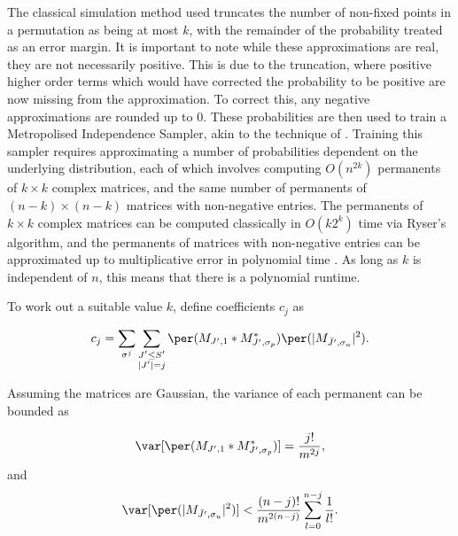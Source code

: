 The classical simulation method used truncates the number of non-fixed points in a permutation as being at most $k$, with the remainder of the probability treated as an error margin. 
It is important to note while these approximations are real, they are not necessarily positive. 
This is due to the truncation, where positive higher order terms which would have corrected the probability to be positive are now missing from the approximation. 
To correct this, any negative approximations are rounded up to $0$.
These probabilities are then used to train a Metropolised Independence Sampler, akin to the technique of \cite{neville2017}. 
Training this sampler requires approximating a number of probabilities dependent on the underlying distribution, each of which involves computing $O(n^{2k})$ permanents of $k\times k$ complex matrices, and the same number of permanents of $(n-k)\times (n-k)$ matrices with non-negative entries. 
The permanents of $k\times k$ complex matrices can be computed classically in $O(k2^k)$ time via Ryser's algorithm, and the permanents of matrices with non-negative entries can be approximated up to multiplicative error in polynomial time \cite{jerrum2004,huber2008}. 
As long as $k$ is independent of $n$, this means that there is a polynomial runtime.

To work out a suitable value $k$, define coefficients $c_j$ as

\begin{equation}
c_j = \sum_{\sigma^j}\sum_{\substack{J'\leq S'\\|J'|=j}}\per(M_{J',1}*M^*_{J',\sigma_p})\per(|M_{\bar{J'},\sigma_u}|^2)\label{eqn:coefficients}.
\end{equation}

Assuming the matrices are Gaussian, the variance of each permanent can be bounded as

\begin{equation}
\var[\per(M_{J',1}*M^*_{J',\sigma_p})] = \frac{j!}{m^{2j}},
\end{equation}
and
\begin{equation}
\var[\per(|M_{\bar{J'},\sigma_u}|^2)] < \frac{(n-j)!}{m^{2(n-j)}}\sum_{l=0}^{n-j}\frac{1}{l!}.
\end{equation}

